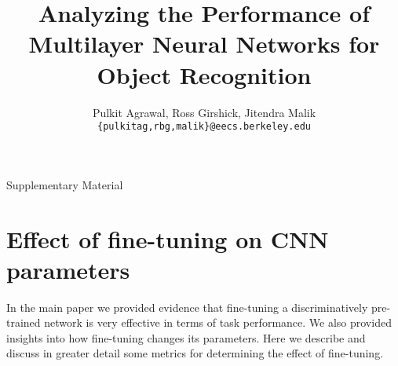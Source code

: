 \documentclass[runningheads]{llncs}
\begin{document}
\pagestyle{headings}
\mainmatter
\title{Analyzing the Performance of Multilayer Neural Networks for Object Recognition}




\author{Pulkit Agrawal, Ross Girshick, Jitendra Malik \\ \texttt{\{pulkitag,rbg,malik\}@eecs.berkeley.edu}}


\maketitle
\begin{center}
\large{Supplementary Material} 
\end{center}
\section{Effect of fine-tuning on CNN parameters}
In the main paper we provided evidence that fine-tuning a discriminatively pre-trained network is very effective in terms of task performance.
We also provided insights into how fine-tuning changes its parameters.
Here we describe and discuss in greater detail some metrics for determining the effect of fine-tuning.
%












\end{document}

